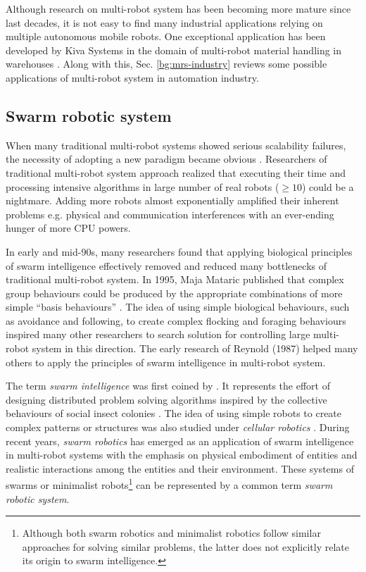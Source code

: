 Although research on multi-robot system has been becoming more mature since last decades, it is not easy to find many industrial applications relying on multiple autonomous mobile robots. One exceptional application has been developed by Kiva Systems in the domain of multi-robot material handling in warehouses \cite{Wurman+2008}. Along with this, Sec. \ref{bg:mrs-industry} reviews some possible applications of multi-robot system in automation industry.
\subsection{Swarm robotic system}
\label{bg:mrs:srs}
When many traditional multi-robot systems showed serious  scalability failures, the necessity of adopting a  new paradigm became obvious \cite{Lerman+2006}. Researchers of traditional multi-robot system approach realized  that  executing their time and processing intensive algorithms in large number of real robots ($\geq 10$) could be a nightmare. Adding more robots almost exponentially amplified their inherent  problems e.g. physical and communication interferences with an ever-ending hunger of more CPU powers. 

In early and mid-90s, many researchers found that applying biological principles of swarm intelligence effectively removed and reduced many bottlenecks of traditional multi-robot system.  In 1995, Maja Mataric published that complex group behaviours could be produced by the appropriate combinations of more simple ``basis behaviours'' \cite{Mataric1995}. The idea of using simple biological behaviours, such as avoidance and following, to create complex flocking and foraging behaviours inspired many other researchers to search solution for controlling large multi-robot system in this direction.  The early research of Reynold (1987) helped many others to apply the principles of swarm intelligence in multi-robot system. 

The term {\em swarm intelligence} was first coined by  . It represents the effort of designing distributed problem solving algorithms inspired by the collective behaviours of social insect colonies \cite{Bonabeau+1999}. The idea of using simple robots to create complex patterns or structures was also studied under {\em cellular robotics} \cite{Fukuda+1987}. During recent years, {\em swarm robotics} has emerged as an application of swarm intelligence in multi-robot systems with the emphasis on physical embodiment of entities and realistic interactions among the entities and their environment. These systems of swarms or minimalist robots\footnote{Although both swarm robotics and minimalist robotics follow similar approaches for solving similar problems, the latter does not explicitly relate its origin to swarm intelligence.} can be represented by a common term {\em swarm robotic system}.

